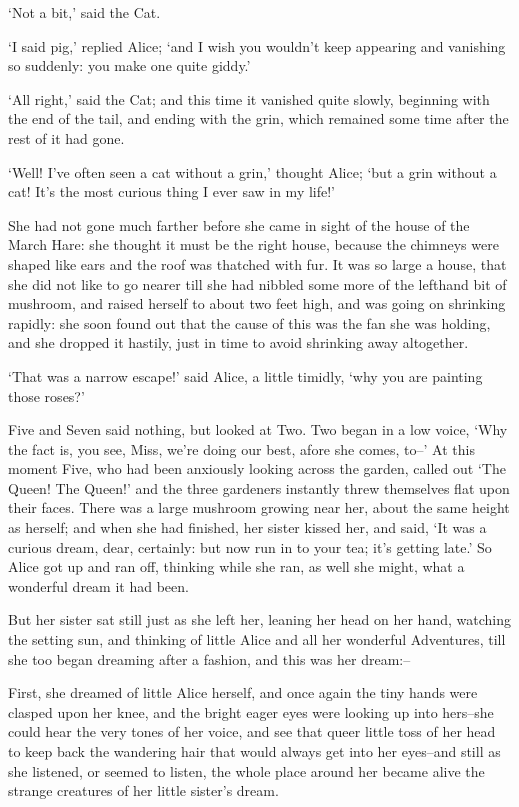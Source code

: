 \documentclass[statementpaper,twoside,openany]{memoir}
\begin{document}
`Not a bit,' said the Cat.

`I said pig,' replied Alice; `and I wish you wouldn't keep appearing and vanishing so suddenly: you make one quite giddy.'

`All right,' said the Cat; and this time it vanished quite slowly, beginning with the end of the tail, and ending with the grin, which remained some time after the rest of it had gone.

`Well! I've often seen a cat without a grin,' thought Alice; `but a grin without a cat! It's the most curious thing I ever saw in my life!'

She had not gone much farther before she came in sight of the house of the March Hare: she thought it must be the right house, because the chimneys were shaped like ears and the roof was thatched with fur. It was so large a house, that she did not like to go nearer till she had nibbled some more of the lefthand bit of mushroom, and raised herself to about two feet high, and was going on shrinking rapidly: she soon found out that the cause of this was the fan she was holding, and she dropped it hastily, just in time to avoid shrinking away altogether.

`That was a narrow escape!' said Alice, a little timidly, `why you are painting those roses?'

Five and Seven said nothing, but looked at Two. Two began in a low voice, `Why the fact is, you see, Miss, we're doing our best, afore she comes, to--' At this moment Five, who had been anxiously looking across the garden, called out `The Queen! The Queen!' and the three gardeners instantly threw themselves flat upon their faces. There was a large mushroom growing near her, about the same height as herself; and when she had finished, her sister kissed her, and said, `It was a curious dream, dear, certainly: but now run in to your tea; it's getting late.' So Alice got up and ran off, thinking while she ran, as well she might, what a wonderful dream it had been.

But her sister sat still just as she left her, leaning her head on her hand, watching the setting sun, and thinking of little Alice and all her wonderful Adventures, till she too began dreaming after a fashion, and this was her dream:--

First, she dreamed of little Alice herself, and once again the tiny hands were clasped upon her knee, and the bright eager eyes were looking up into hers--she could hear the very tones of her voice, and see that queer little toss of her head to keep back the wandering hair that would always get into her eyes--and still as she listened, or seemed to listen, the whole place around her became alive the strange creatures of her little sister's dream.
\end{document}
